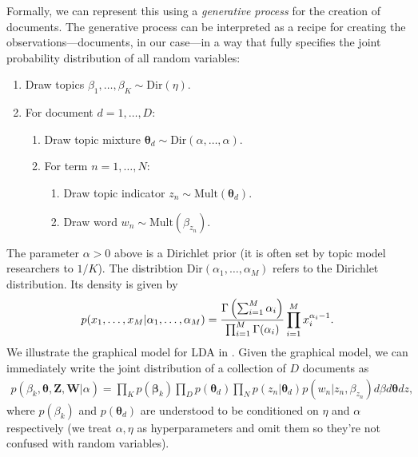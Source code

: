 Formally, we can represent this using a \emph{generative process} for
the creation of documents.  The generative process can be interpreted as
a recipe for creating the observations---documents, in our case---in a
way that fully specifies the joint probability distribution of all
random variables:
\begin{enumerate}
  \item Draw topics $\beta_1, \ldots, \beta_K \sim \mbox{Dir}(\eta)$.
    \item For document $d=1, \ldots, D$:
    \begin{enumerate}
    \item Draw topic mixture $\bm \theta_d \sim \mbox{Dir}(\alpha, \ldots, \alpha)$.
    \item For term $n=1, \ldots, N$:
      \begin{enumerate}
      \item Draw topic indicator $z_n \sim \mbox{Mult}(\bm \theta_d)$.
      \item Draw word $w_n \sim \mbox{Mult}(\beta_{z_n})$.
      \end{enumerate}
    \end{enumerate}
\end{enumerate}
The parameter $\alpha > 0$ above is a Dirichlet prior (it is often set by
topic model researchers to $1/K$).  The distribtion $\mbox{Dir}(\alpha_1, \ldots, \alpha_M)$ refers to the Dirichlet distribution.  Its density is given by
\begin{align}
  p(x_1, \ldots, x_M | \alpha_1, \ldots, \alpha_M) =
  \frac{\large \Gamma \left( \sum_{i=1}^M \alpha_i \right)}
       {\prod_{i=1}^M \large \Gamma(\alpha_i)}
       \prod_{i=1}^M x_i^{\alpha_i - 1}.
\end{align}
We illustrate the graphical model for LDA in .  Given the graphical model, we can immediately write the joint distribution of a collection of $D$ documents as
\begin{align}
  p(\beta_k, \bm \theta, \bm Z, \bm W | \alpha) = 
  \prod_K p(\bm \beta_k)
  \prod_D p(\bm \theta_d) \prod_N p(z_n | \bm \theta_d) p(w_n | z_n, \beta_{z_n}) d\beta d\bm \theta dz,
\end{align}
where $p(\beta_k)$ and $p(\bm \theta_d)$ are understood to be conditioned
on $\eta$ and $\alpha$ respectively (we treat $\alpha, \eta$ as
hyperparameters and omit them so they're not confused with random
variables).


